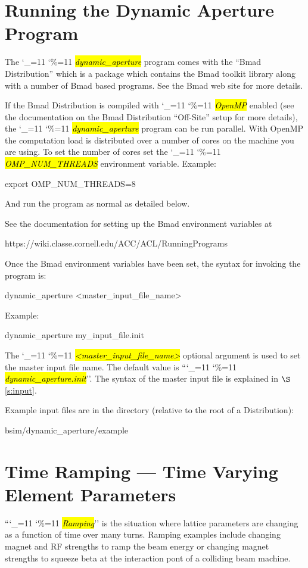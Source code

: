 \documentclass{hitec}
\newcommand\dottcmd[1]{\hl{\em#1}\endgroup}
\newcommand{\vn}{\begingroup\catcode`\_=11 \catcode`\%=11 \dottcmd}
\newcommand{\da}{\vn{dynamic_aperture}\xspace}
\newcommand{\sref}[1]{$\S$\ref{#1}}
\newcommand{\Section}[1]{\section{#1}\vspace*{-1ex}}
\begin{document}
\Section{Running the Dynamic Aperture Program} 
\label{s:run}

The \da program comes with the ``Bmad Distribution'' which is a package which contains the Bmad toolkit
library along with a number of Bmad based programs. See the Bmad web site for more details.

If the Bmad Distribution is compiled with \vn{OpenMP} enabled (see the documentation on the Bmad
Distribution ``Off-Site'' setup for more details), the \da program can be run parallel. With OpenMP
the computation load is distributed over a number of cores on the machine you are using. To set the
number of cores set the \vn{OMP_NUM_THREADS} environment variable. Example:
\begin{code}
export OMP_NUM_THREADS=8
\end{code}
And run the program as normal as detailed below.

See the documentation for setting up the Bmad environment variables at
\begin{code}
  https://wiki.classe.cornell.edu/ACC/ACL/RunningPrograms
\end{code}

Once the Bmad environment variables have been set, the syntax for invoking the program is:
\begin{code}
  dynamic_aperture {<master_input_file_name>}
\end{code}
Example:
\begin{code}
  dynamic_aperture my_input_file.init
\end{code}
The \vn{<master_input_file_name>} optional argument is used to set the master input file name. The
default value is ``\vn{dynamic_aperture.init}''. The syntax of the master input file is explained
in \sref{s:input}.

Example input files are in the directory (relative to the root of a Distribution):
\begin{code}
  bsim/dynamic_aperture/example
\end{code}

\Section{Time Ramping --- Time Varying Element Parameters}
\label{s:ramp}

``\vn{Ramping}'' is the situation where lattice parameters are changing as a function of time over
many turns. Ramping examples include changing magnet and RF strengths to ramp the beam energy or
changing magnet strengths to squeeze beta at the interaction pont of a colliding beam machine.
\end{document}
